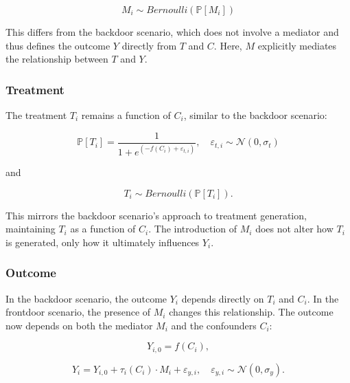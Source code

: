 \documentclass{article}
\numberwithin{equation}{section}
\begin{document}
\begin{equation}
    M_i \sim Bernoulli(\mathbb{P}[M_i])
\end{equation}

This differs from the backdoor scenario, which does not involve a mediator and thus defines the outcome $Y$ directly from $T$ and $C$. Here, $M$ explicitly mediates the relationship between $T$ and $Y$.

\subsubsection{Treatment}

The treatment $T_i$ remains a function of $C_i$, similar to the backdoor scenario:

\begin{equation}
    \mathbb{P}[T_i] = \frac{1}{1 + e^{(-f(C_i) + \varepsilon_{t, i})}},
    \quad \varepsilon_{t, i} \sim \mathcal{N}(0, \sigma_t)
    \label{eq:probability_of_treatment_frontdoor}
\end{equation}

and

\begin{equation}
    T_i \sim Bernoulli(\mathbb{P}[T_i]).
\end{equation}

This mirrors the backdoor scenario’s approach to treatment generation, maintaining $T_i$ as a function of $C_i$. The introduction of $M_i$ does not alter how $T_i$ is generated, only how it ultimately influences $Y_i$.

\subsubsection{Outcome}

In the backdoor scenario, the outcome $Y_i$ depends directly on $T_i$ and $C_i$. In the frontdoor scenario, the presence of $M_i$ changes this relationship. The outcome now depends on both the mediator $M_i$ and the confounders $C_i$:

\begin{equation}
    Y_{i,0} = f(C_i),
    \label{eq:potential_outcome_no_treatment_frontdoor}
\end{equation}

\begin{equation}
    Y_i = Y_{i,0} + \tau_i(C_i) \cdot M_i + \varepsilon_{y,i}, \quad \varepsilon_{y, i} \sim \mathcal{N}(0, \sigma_{y}).
\end{equation}
\end{document}
